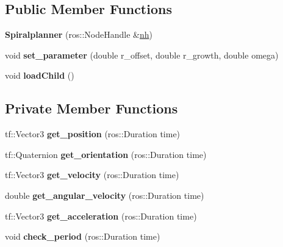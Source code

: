 \subsection*{Public Member Functions}
\begin{DoxyCompactItemize}
\item 
{\bfseries Spiralplanner} (ros\+::\+Node\+Handle \&\hyperlink{classPlanner_a9714d036f444a07ce90be8d135b9a40c}{nh})\hypertarget{classSpiralplanner_af4fea271fc1dba2cde0d4e91e549ac00}{}\label{classSpiralplanner_af4fea271fc1dba2cde0d4e91e549ac00}

\item 
void {\bfseries set\+\_\+parameter} (double r\+\_\+offset, double r\+\_\+growth, double omega)\hypertarget{classSpiralplanner_a29bf0fc1aa4461c29fbe39e73f819b43}{}\label{classSpiralplanner_a29bf0fc1aa4461c29fbe39e73f819b43}

\item 
void {\bfseries load\+Child} ()\hypertarget{classSpiralplanner_a13b72cad3bd032c37f056303b7aeebf4}{}\label{classSpiralplanner_a13b72cad3bd032c37f056303b7aeebf4}

\end{DoxyCompactItemize}
\subsection*{Private Member Functions}
\begin{DoxyCompactItemize}
\item 
tf\+::\+Vector3 {\bfseries get\+\_\+position} (ros\+::\+Duration time)\hypertarget{classSpiralplanner_a5aacbbacdd271e9257bc6bb043d8c4e0}{}\label{classSpiralplanner_a5aacbbacdd271e9257bc6bb043d8c4e0}

\item 
tf\+::\+Quaternion {\bfseries get\+\_\+orientation} (ros\+::\+Duration time)\hypertarget{classSpiralplanner_ac6e8919f923ac0c4d888688a5d31503c}{}\label{classSpiralplanner_ac6e8919f923ac0c4d888688a5d31503c}

\item 
tf\+::\+Vector3 {\bfseries get\+\_\+velocity} (ros\+::\+Duration time)\hypertarget{classSpiralplanner_a4357a15b2fb9b585c17dee5a8662edfd}{}\label{classSpiralplanner_a4357a15b2fb9b585c17dee5a8662edfd}

\item 
double {\bfseries get\+\_\+angular\+\_\+velocity} (ros\+::\+Duration time)\hypertarget{classSpiralplanner_aea4f2405021302a3ceca29d485cd3f01}{}\label{classSpiralplanner_aea4f2405021302a3ceca29d485cd3f01}

\item 
tf\+::\+Vector3 {\bfseries get\+\_\+acceleration} (ros\+::\+Duration time)\hypertarget{classSpiralplanner_aac5f5d9c7b3180bbb8791b257445705c}{}\label{classSpiralplanner_aac5f5d9c7b3180bbb8791b257445705c}

\item 
void {\bfseries check\+\_\+period} (ros\+::\+Duration time)\hypertarget{classSpiralplanner_aa609defc35ad224a8f3bcb95d9cf8844}{}\label{classSpiralplanner_aa609defc35ad224a8f3bcb95d9cf8844}

\end{DoxyCompactItemize}
